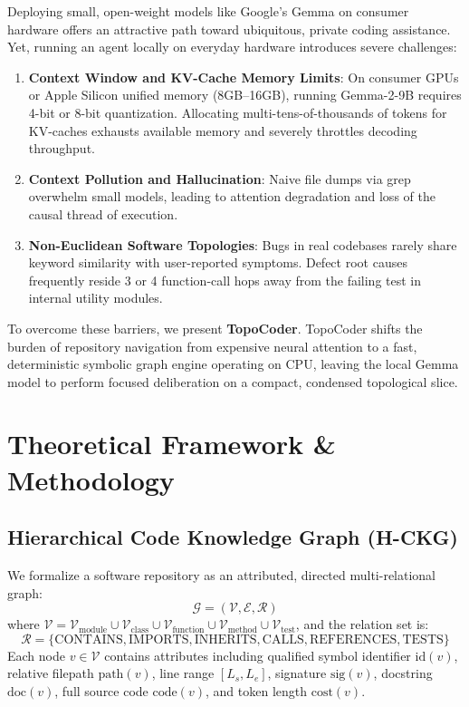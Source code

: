 \documentclass[11pt,a4paper]{article}
\begin{document}
Deploying small, open-weight models like Google's Gemma \cite{gemma2024team} on consumer hardware offers an attractive path toward ubiquitous, private coding assistance. Yet, running an agent locally on everyday hardware introduces severe challenges:
\begin{enumerate}
    \item \textbf{Context Window and KV-Cache Memory Limits}: On consumer GPUs or Apple Silicon unified memory (8GB--16GB), running Gemma-2-9B requires 4-bit or 8-bit quantization. Allocating multi-tens-of-thousands of tokens for KV-caches exhausts available memory and severely throttles decoding throughput.
    \item \textbf{Context Pollution and Hallucination}: Naive file dumps via grep overwhelm small models, leading to attention degradation and loss of the causal thread of execution.
    \item \textbf{Non-Euclidean Software Topologies}: Bugs in real codebases rarely share keyword similarity with user-reported symptoms. Defect root causes frequently reside 3 or 4 function-call hops away from the failing test in internal utility modules.
\end{enumerate}

To overcome these barriers, we present \textbf{TopoCoder}. TopoCoder shifts the burden of repository navigation from expensive neural attention to a fast, deterministic symbolic graph engine operating on CPU, leaving the local Gemma model to perform focused deliberation on a compact, condensed topological slice.

\section{Theoretical Framework \& Methodology}

\subsection{Hierarchical Code Knowledge Graph (H-CKG)}
We formalize a software repository as an attributed, directed multi-relational graph:
\begin{equation}
\mathcal{G} = (\mathcal{V}, \mathcal{E}, \mathcal{R})
\end{equation}
where $\mathcal{V} = \mathcal{V}_{\text{module}} \cup \mathcal{V}_{\text{class}} \cup \mathcal{V}_{\text{function}} \cup \mathcal{V}_{\text{method}} \cup \mathcal{V}_{\text{test}}$, and the relation set is:
\begin{equation}
\mathcal{R} = \{\text{CONTAINS}, \text{IMPORTS}, \text{INHERITS}, \text{CALLS}, \text{REFERENCES}, \text{TESTS}\}
\end{equation}
Each node $v \in \mathcal{V}$ contains attributes including qualified symbol identifier $\text{id}(v)$, relative filepath $\text{path}(v)$, line range $[L_s, L_e]$, signature $\text{sig}(v)$, docstring $\text{doc}(v)$, full source code $\text{code}(v)$, and token length $\text{cost}(v)$.
\end{document}
